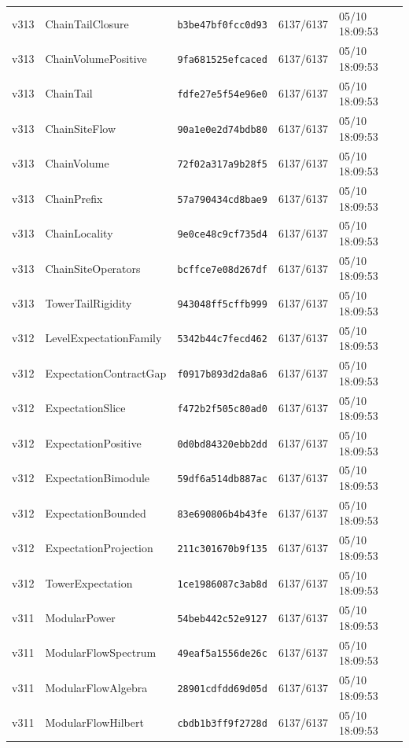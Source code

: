 \documentclass[11pt]{article}
\theoremstyle{definition}\newtheorem{deriv}{Derivation}
\begin{document}
{\begin{longtable}{@{}lllll@{}}
v313 & ChainTailClosure & \texttt{b3be47bf0fcc0d93} & 6137/6137 & 05/10 18:09:53 \\
v313 & ChainVolumePositive & \texttt{9fa681525efcaced} & 6137/6137 & 05/10 18:09:53 \\
v313 & ChainTail & \texttt{fdfe27e5f54e96e0} & 6137/6137 & 05/10 18:09:53 \\
v313 & ChainSiteFlow & \texttt{90a1e0e2d74bdb80} & 6137/6137 & 05/10 18:09:53 \\
v313 & ChainVolume & \texttt{72f02a317a9b28f5} & 6137/6137 & 05/10 18:09:53 \\
v313 & ChainPrefix & \texttt{57a790434cd8bae9} & 6137/6137 & 05/10 18:09:53 \\
v313 & ChainLocality & \texttt{9e0ce48c9cf735d4} & 6137/6137 & 05/10 18:09:53 \\
v313 & ChainSiteOperators & \texttt{bcffce7e08d267df} & 6137/6137 & 05/10 18:09:53 \\
v313 & TowerTailRigidity & \texttt{943048ff5cffb999} & 6137/6137 & 05/10 18:09:53 \\
v312 & LevelExpectationFamily & \texttt{5342b44c7fecd462} & 6137/6137 & 05/10 18:09:53 \\
v312 & ExpectationContractGap & \texttt{f0917b893d2da8a6} & 6137/6137 & 05/10 18:09:53 \\
v312 & ExpectationSlice & \texttt{f472b2f505c80ad0} & 6137/6137 & 05/10 18:09:53 \\
v312 & ExpectationPositive & \texttt{0d0bd84320ebb2dd} & 6137/6137 & 05/10 18:09:53 \\
v312 & ExpectationBimodule & \texttt{59df6a514db887ac} & 6137/6137 & 05/10 18:09:53 \\
v312 & ExpectationBounded & \texttt{83e690806b4b43fe} & 6137/6137 & 05/10 18:09:53 \\
v312 & ExpectationProjection & \texttt{211c301670b9f135} & 6137/6137 & 05/10 18:09:53 \\
v312 & TowerExpectation & \texttt{1ce1986087c3ab8d} & 6137/6137 & 05/10 18:09:53 \\
v311 & ModularPower & \texttt{54beb442c52e9127} & 6137/6137 & 05/10 18:09:53 \\
v311 & ModularFlowSpectrum & \texttt{49eaf5a1556de26c} & 6137/6137 & 05/10 18:09:53 \\
v311 & ModularFlowAlgebra & \texttt{28901cdfdd69d05d} & 6137/6137 & 05/10 18:09:53 \\
v311 & ModularFlowHilbert & \texttt{cbdb1b3ff9f2728d} & 6137/6137 & 05/10 18:09:53 \\

\end{longtable}}
\end{document}
